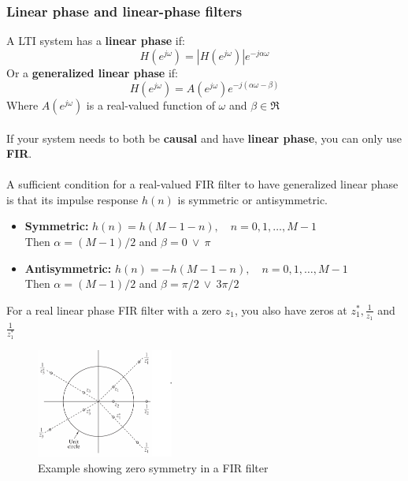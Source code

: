 \documentclass{article}
\begin{document}
\subsubsection{Linear phase and linear-phase filters}
A LTI system has a \textbf{linear phase} if:
\begin{equation}
    H(e^{j\omega}) = |H(e^{j\omega})|e^{-j\alpha\omega}
\end{equation}
Or a \textbf{generalized linear phase} if:
\begin{equation}
    H(e^{j\omega}) = A(e^{j\omega})e^{-j(\alpha\omega - \beta)}
\end{equation}
Where $A(e^{j\omega})$ is a real-valued function of $\omega$ and $\beta \in \mathfrak{R} $
\\
\\
If your system needs to both be \textbf{causal} and have \textbf{linear phase}, you can only use \textbf{FIR}.
\\
\\
A sufficient condition for a real-valued FIR filter to have generalized linear phase is that its impulse response $h(n)$ is symmetric or antisymmetric.
\begin{itemize}
    \item \textbf{Symmetric:} $h(n) = h(M-1-n), \quad n=0,1,\ldots,M-1$
    \\
    Then $\alpha = (M-1)/2$ and $\beta = 0 \ \vee \ \pi$
    \item \textbf{Antisymmetric:} $h(n) = -h(M-1-n), \quad n=0,1,\ldots,M-1$
    \\
    Then $\alpha = (M-1)/2$ and $\beta = \pi/2 \ \vee \ 3\pi/2$
\end{itemize}
For a real linear phase FIR filter with a zero $z_1$, you also have zeros at $z_1^\ast, \frac{1}{z_1}$ and $\frac{1}{z_1^\ast}$
\begin{figure}[h!]
    \centering
    \includegraphics[width=0.4\textwidth]{figures/Filter design/zero_location_FIR.png}
    \caption{Example showing zero symmetry in a FIR filter}
    \label{fig:zero_location_FIR}
\end{figure}
\end{document}
